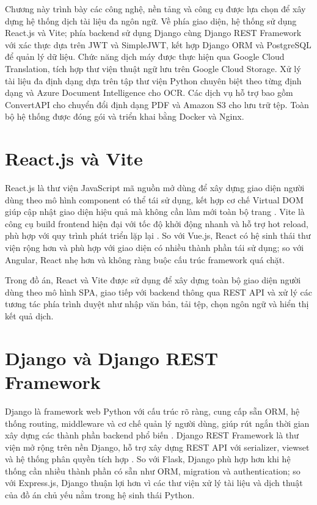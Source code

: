\documentclass[../DoAn.tex]{subfiles}
\begin{document}
Chương này trình bày các công nghệ, nền tảng và công cụ được lựa chọn để xây dựng hệ thống dịch tài liệu đa ngôn ngữ. Về phía giao diện, hệ thống sử dụng React.js và Vite; phía backend sử dụng Django cùng Django REST Framework với xác thực dựa trên JWT và SimpleJWT, kết hợp Django ORM và PostgreSQL để quản lý dữ liệu. Chức năng dịch máy được thực hiện qua Google Cloud Translation, tích hợp thư viện thuật ngữ lưu trên Google Cloud Storage. Xử lý tài liệu đa định dạng dựa trên tập thư viện Python chuyên biệt theo từng định dạng và Azure Document Intelligence cho OCR. Các dịch vụ hỗ trợ bao gồm ConvertAPI cho chuyển đổi định dạng PDF và Amazon S3 cho lưu trữ tệp. Toàn bộ hệ thống được đóng gói và triển khai bằng Docker và Nginx.

\section{React.js và Vite}
\label{section:3.1}

React.js là thư viện JavaScript mã nguồn mở dùng để xây dựng giao diện người dùng theo mô hình component có thể tái sử dụng, kết hợp cơ chế Virtual DOM giúp cập nhật giao diện hiệu quả mà không cần làm mới toàn bộ trang \cite{reactjs}. Vite là công cụ build frontend hiện đại với tốc độ khởi động nhanh và hỗ trợ hot reload, phù hợp với quy trình phát triển lặp lại \cite{vitejs}. So với Vue.js, React có hệ sinh thái thư viện rộng hơn và phù hợp với giao diện có nhiều thành phần tái sử dụng; so với Angular, React nhẹ hơn và không ràng buộc cấu trúc framework quá chặt.

Trong đồ án, React và Vite được sử dụng để xây dựng toàn bộ giao diện người dùng theo mô hình SPA, giao tiếp với backend thông qua REST API và xử lý các tương tác phía trình duyệt như nhập văn bản, tải tệp, chọn ngôn ngữ và hiển thị kết quả dịch.

\section{Django và Django REST Framework}
\label{section:3.2}

Django là framework web Python với cấu trúc rõ ràng, cung cấp sẵn ORM, hệ thống routing, middleware và cơ chế quản lý người dùng, giúp rút ngắn thời gian xây dựng các thành phần backend phổ biến \cite{django}. Django REST Framework là thư viện mở rộng trên nền Django, hỗ trợ xây dựng REST API với serializer, viewset và hệ thống phân quyền tích hợp \cite{django-rest-framework}. So với Flask, Django phù hợp hơn khi hệ thống cần nhiều thành phần có sẵn như ORM, migration và authentication; so với Express.js, Django thuận lợi hơn vì các thư viện xử lý tài liệu và dịch thuật của đồ án chủ yếu nằm trong hệ sinh thái Python.
\end{document}
